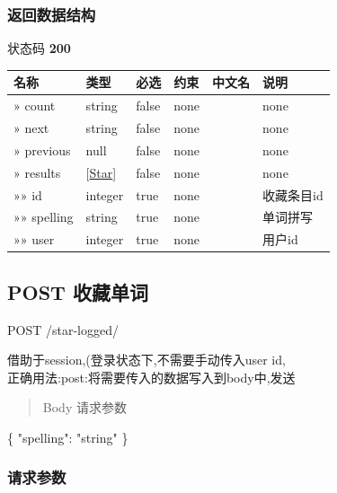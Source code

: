 \documentclass[
]{article}
\newenvironment{Shaded}{}{}
\newcommand{\DataTypeTok}[1]{\textcolor[rgb]{0.56,0.13,0.00}{#1}}
\newcommand{\FunctionTok}[1]{\textcolor[rgb]{0.02,0.16,0.49}{#1}}
\newcommand{\StringTok}[1]{\textcolor[rgb]{0.25,0.44,0.63}{#1}}
\begin{document}
\hypertarget{ux8fd4ux56deux6570ux636eux7ed3ux6784-22}{%
\subsubsection{返回数据结构}\label{ux8fd4ux56deux6570ux636eux7ed3ux6784-22}}

状态码 \textbf{200}

\begin{longtable}[]{@{}llllll@{}}
\toprule
名称 & 类型 & 必选 & 约束 & 中文名 & 说明 \\
\midrule
\endhead
» count & string & false & none & & none \\
» next & string & false & none & & none \\
» previous & null & false & none & & none \\
» results & {[}\protect\hyperlink{schemastar}{Star}{]} & false & none &
& none \\
»» id & integer & true & none & & 收藏条目id \\
»» spelling & string & true & none & & 单词拼写 \\
»» user & integer & true & none & & 用户id \\
\bottomrule
\end{longtable}

\hypertarget{post-ux6536ux85cfux5355ux8bcd-1}{%
\subsection{POST 收藏单词}\label{post-ux6536ux85cfux5355ux8bcd-1}}

POST /star-logged/

借助于session,(登录状态下,不需要手动传入user id,\\
正确用法:post:将需要传入的数据写入到body中,发送

\begin{quote}
Body 请求参数
\end{quote}

\begin{Shaded}
\begin{Highlighting}[]
\FunctionTok{\{}
  \DataTypeTok{"spelling"}\FunctionTok{:} \StringTok{"string"}
\FunctionTok{\}}
\end{Highlighting}
\end{Shaded}

\hypertarget{ux8bf7ux6c42ux53c2ux6570-27}{%
\subsubsection{请求参数}\label{ux8bf7ux6c42ux53c2ux6570-27}}
\end{document}
